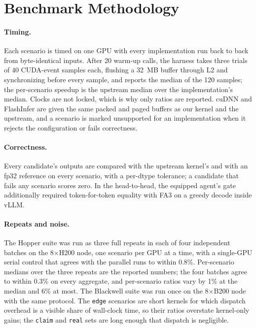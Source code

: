 \section{Benchmark Methodology}
\label{app:bench}

\paragraph{Timing.} Each scenario is timed on one GPU with every implementation run back to back
from byte-identical inputs. After 20 warm-up calls, the harness takes three trials of 40 CUDA-event
samples each, flushing a 32~MB buffer through L2 and synchronizing before every sample, and reports
the median of the 120 samples; the per-scenario speedup is the upstream median over the
implementation's median. Clocks are not locked, which is why only ratios are reported. cuDNN and
FlashInfer are given the same packed and paged buffers as our kernel and the upstream, and a
scenario is marked unsupported for an implementation when it rejects the configuration or fails
correctness.

\paragraph{Correctness.} Every candidate's outputs are compared with the upstream kernel's and with
an fp32 reference on every scenario, with a per-dtype tolerance; a candidate that fails any scenario
scores zero. In the head-to-head, the equipped agent's gate additionally required token-for-token
equality with FA3 on a greedy decode inside vLLM.

\paragraph{Repeats and noise.} The Hopper suite was run as three full repeats in each of four
independent batches on the 8$\times$H200 node, one scenario per GPU at a time, with a single-GPU
serial control that agrees with the parallel runs to within 0.8\%. Per-scenario medians over the
three repeats are the reported numbers; the four batches agree to within 0.3\% on every aggregate,
and per-scenario ratios vary by 1\% at the median and 6\% at most. The Blackwell suite was run once
on the 8$\times$B200 node with the same protocol. The \texttt{edge} scenarios are short kernels for
which dispatch overhead is a visible share of wall-clock time, so their ratios overstate kernel-only
gains; the \texttt{claim} and \texttt{real} sets are long enough that dispatch is negligible.
